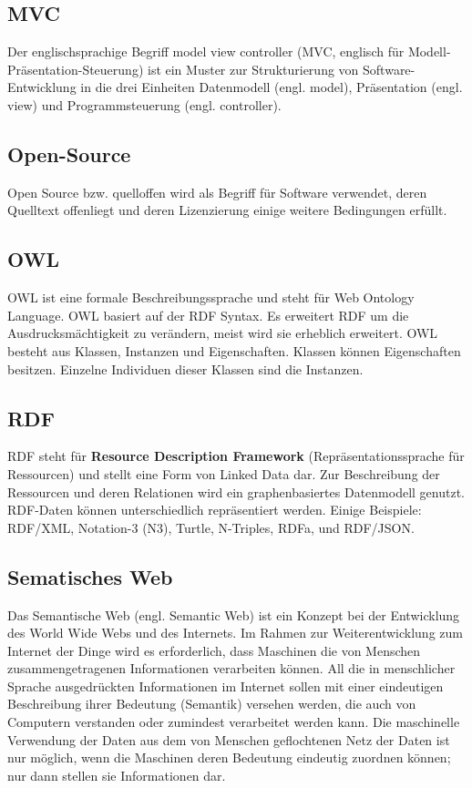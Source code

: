 \documentclass[11pt,a4paper]{article}
\begin{document}
\subsection{MVC}
Der englischsprachige Begriff model view controller (MVC, englisch für Modell-Präsentation-Steuerung) ist ein Muster zur Strukturierung von Software-Entwicklung in die drei Einheiten Datenmodell (engl. model), Präsentation (engl. view) und Programmsteuerung (engl. controller).
\subsection{Open-Source}
Open Source bzw. quelloffen wird als Begriff für Software verwendet, deren Quelltext offenliegt und deren Lizenzierung einige weitere Bedingungen erfüllt.
\subsection{OWL}
OWL ist eine formale Beschreibungssprache und steht für Web Ontology Language. OWL basiert auf der RDF Syntax. Es erweitert RDF um die Ausdrucksmächtigkeit zu verändern, meist wird sie erheblich erweitert. OWL besteht aus Klassen, Instanzen und Eigenschaften. Klassen können Eigenschaften besitzen. Einzelne Individuen dieser Klassen sind die Instanzen.
\subsection{RDF}
RDF steht für \textbf{Resource Description Framework} (Repräsentationssprache für Ressourcen) und stellt eine
Form von Linked Data dar. Zur Beschreibung der Ressourcen und deren Relationen wird ein 
graphenbasiertes Datenmodell genutzt. RDF-Daten können unterschiedlich repräsentiert werden.
Einige Beispiele: RDF/XML, Notation-3 (N3), Turtle, N-Triples, RDFa, und RDF/JSON.
\subsection{Sematisches Web}
Das Semantische Web (engl. Semantic Web) ist ein Konzept bei der Entwicklung des World Wide Webs und des   Internets. Im Rahmen zur Weiterentwicklung zum Internet der Dinge wird es erforderlich, dass Maschinen die von   Menschen  zusammengetragenen Informationen verarbeiten können. All die   in  menschlicher Sprache ausgedrückten Informationen im Internet sollen   mit  einer eindeutigen Beschreibung ihrer Bedeutung (Semantik)   versehen  werden, die auch von Computern verstanden oder zumindest   verarbeitet  werden kann. Die maschinelle Verwendung der Daten aus dem   von Menschen  geflochtenen Netz der Daten ist nur möglich, wenn die   Maschinen deren  Bedeutung eindeutig zuordnen können; nur dann stellen   sie Informationen  dar.
\end{document}
